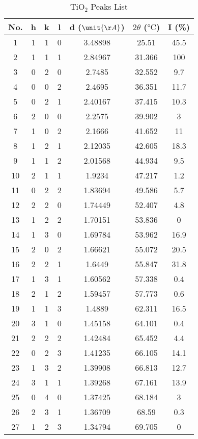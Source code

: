 \documentclass[11pt]{article}
\begin{document}
	\begin{table}[htbp]
		\centering
		\caption{TiO$_2$ Peaks List}
		\begin{tabular}{ccccccc}
			\toprule
			No. & h & k & l & d ($\unit{\AA}$) & $2\theta$ ($\unit{\degreeCelsius}$) & I (\%) \\
			\midrule
			1 & 1 & 1 & 0 & 3.48898 & 25.51 & 45.5 \\
			2 & 1 & 1 & 1 & 2.84967 & 31.366 & 100 \\
			3 & 0 & 2 & 0 & 2.7485 & 32.552 & 9.7 \\
			4 & 0 & 0 & 2 & 2.4695 & 36.351 & 11.7 \\
			5 & 0 & 2 & 1 & 2.40167 & 37.415 & 10.3 \\
			6 & 2 & 0 & 0 & 2.2575 & 39.902 & 3 \\
			7 & 1 & 0 & 2 & 2.1666 & 41.652 & 11 \\
			8 & 1 & 2 & 1 & 2.12035 & 42.605 & 18.3 \\
			9 & 1 & 1 & 2 & 2.01568 & 44.934 & 9.5 \\
			10 & 2 & 1 & 1 & 1.9234 & 47.217 & 1.2 \\
			11 & 0 & 2 & 2 & 1.83694 & 49.586 & 5.7 \\
			12 & 2 & 2 & 0 & 1.74449 & 52.407 & 4.8 \\
			13 & 1 & 2 & 2 & 1.70151 & 53.836 & 0 \\
			14 & 1 & 3 & 0 & 1.69784 & 53.962 & 16.9 \\
			15 & 2 & 0 & 2 & 1.66621 & 55.072 & 20.5 \\
			16 & 2 & 2 & 1 & 1.6449 & 55.847 & 31.8 \\
			17 & 1 & 3 & 1 & 1.60562 & 57.338 & 0.4 \\
			18 & 2 & 1 & 2 & 1.59457 & 57.773 & 0.6 \\
			19 & 1 & 1 & 3 & 1.4889 & 62.311 & 16.5 \\
			20 & 3 & 1 & 0 & 1.45158 & 64.101 & 0.4 \\
			21 & 2 & 2 & 2 & 1.42484 & 65.452 & 4.4 \\
			22 & 0 & 2 & 3 & 1.41235 & 66.105 & 14.1 \\
			23 & 1 & 3 & 2 & 1.39908 & 66.813 & 12.7 \\
			24 & 3 & 1 & 1 & 1.39268 & 67.161 & 13.9 \\
			25 & 0 & 4 & 0 & 1.37425 & 68.184 & 3 \\
			26 & 2 & 3 & 1 & 1.36709 & 68.59 & 0.3 \\
			27 & 1 & 2 & 3 & 1.34794 & 69.705 & 0 \\

\end{tabular}
\end{table}
\end{document}
